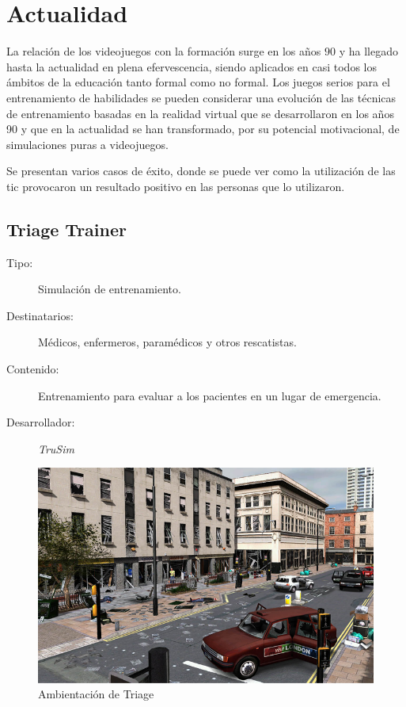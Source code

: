 \section{Actualidad}
\label{sec:tics_ACTUALIDAD}

La relación de los videojuegos con la formación surge en los años $90$ y ha
llegado hasta la actualidad en plena efervescencia, siendo aplicados en casi
todos los ámbitos de la educación tanto formal como no formal. Los juegos serios
para el entrenamiento de habilidades se pueden considerar una evolución de las
técnicas de entrenamiento basadas en la realidad virtual que se desarrollaron en
los años 90 y que en la actualidad se han transformado, por su potencial
motivacional, de simulaciones puras a
videojuegos\cite{videojuegos:gonzaleztardon}.


Se presentan varios casos de éxito, donde se puede ver como la utilización de
las \Gls{tic} provocaron un resultado positivo en las personas que lo
utilizaron.

\subsection{Triage Trainer}
	

\begin{description}
\item[Tipo:] Simulación de entrenamiento.
\item[Destinatarios:] Médicos, enfermeros, paramédicos y otros rescatistas.
\item[Contenido:] Entrenamiento para evaluar a los pacientes en un lugar de
    emergencia.
\item[Desarrollador:] \emph{TruSim}
\end{description}

\begin{figure}[h!] 
\centering 
\includegraphics[scale=0.5]{tics/images/triage.png}
\caption{Ambientación de Triage}
\label{fig:triage}
\end{figure}


